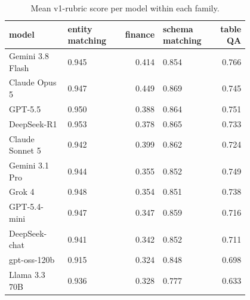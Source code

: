 \begin{table}[htbp]
\centering\scriptsize
\caption{Mean v1-rubric score per model within each family.}
\label{tab:family_scores}
\setlength{\tabcolsep}{3pt}
\begin{tabular}{p{0.278\linewidth}p{0.261\linewidth}rp{0.261\linewidth}r}
\toprule
model & entity matching & finance & schema matching & table QA \\
\midrule
Gemini 3.8 Flash & 0.945 & 0.414 & 0.854 & 0.766 \\
Claude Opus 5 & 0.947 & 0.449 & 0.869 & 0.745 \\
GPT-5.5 & 0.950 & 0.388 & 0.864 & 0.751 \\
DeepSeek-R1 & 0.953 & 0.378 & 0.865 & 0.733 \\
Claude Sonnet 5 & 0.942 & 0.399 & 0.862 & 0.724 \\
Gemini 3.1 Pro & 0.944 & 0.355 & 0.852 & 0.749 \\
Grok 4 & 0.948 & 0.354 & 0.851 & 0.738 \\
GPT-5.4-mini & 0.947 & 0.347 & 0.859 & 0.716 \\
DeepSeek-chat & 0.941 & 0.342 & 0.852 & 0.711 \\
gpt-oss-120b & 0.915 & 0.324 & 0.848 & 0.698 \\
Llama 3.3 70B & 0.936 & 0.328 & 0.777 & 0.633 \\
\bottomrule
\end{tabular}
\end{table}
